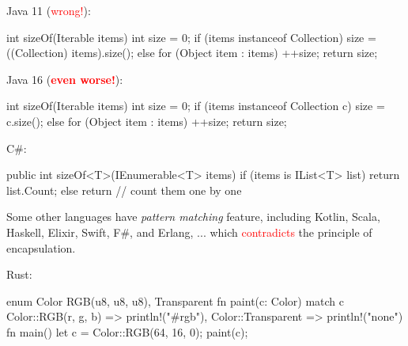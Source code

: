 \documentclass{article}
\begin{document}
\begin{pptWide}{2}
Java 11 (\textcolor{red}{wrong!}):
\par
{\small\begin{ffcode}
int sizeOf(Iterable items) {
  int size = 0;
  if (items instanceof Collection) {
    size = ((Collection) items).size();
  } else {
    for (Object item : items) {
      ++size;
    }
  }
  return size;
}
\end{ffcode}
}
\par\columnbreak\par
Java 16 (\textcolor{red}{\textbf{even worse!}}):
\par
{\small\begin{ffcode}
int sizeOf(Iterable items) {
  int size = 0;
  if (items instanceof Collection c) {
    size = c.size();
  } else {
    for (Object item : items) {
      ++size;
    }
  }
  return size;
}
\end{ffcode}
}
\end{pptWide}
\par
\plush{}

\begin{pptWide}{2}
C\#:\par
{\scriptsize\begin{ffcode}
public int sizeOf<T>(IEnumerable<T> items) {
  if (items is IList<T> list) {
    return list.Count;
  } else {
    return // count them one by one
  }
}
\end{ffcode}
}
\par
Some other languages have \emph{pattern matching} feature,
including Kotlin, Scala, Haskell, Elixir, Swift, F\#, and Erlang, ...
which \textcolor{red}{contradicts} the principle of encapsulation.
\par\columnbreak\par
Rust:
\par
{\scriptsize\begin{ffcode}
enum Color {
  RGB(u8, u8, u8),
  Transparent
}
fn paint(c: Color) {
  match c {
    Color::RGB(r, g, b) =>
      println!("#{r}{g}{b}"),
    Color::Transparent =>
      println!("none")
  }
}
fn main() {
  let c = Color::RGB(64, 16, 0);
  paint(c);
}
\end{ffcode}
}
\end{pptWide}
\par
\plush{}

\end{document}
